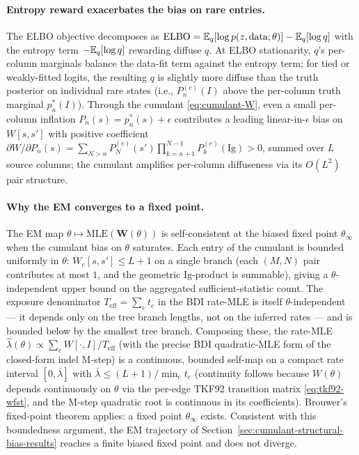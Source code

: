 \paragraph{Entropy reward exacerbates the bias on rare entries.}
The ELBO objective decomposes as $\mathrm{ELBO} = \mathbb{E}_q[\log p(z,
\text{data}; \theta)] - \mathbb{E}_q[\log q]$ with the entropy term
$-\mathbb{E}_q[\log q]$ rewarding diffuse $q$.  At ELBO stationarity,
$q$'s per-column marginals balance the data-fit term against the
entropy term; for tied or weakly-fitted logits, the resulting $q$
is slightly more diffuse than the truth posterior on individual
rare states (i.e., $P_n^{(e)}(I)$ above the per-column truth
marginal $p_n^*(I)$).  Through the cumulant
\eqref{eq:cumulant-W}, even a small per-column inflation
$P_n(s) = p_n^*(s) + \epsilon$ contributes a leading
linear-in-$\epsilon$ bias on $W[s, s']$ with positive coefficient
$\partial W / \partial P_n(s) = \sum_{N > n} P_N^{(e)}(s')
\prod_{k=n+1}^{N-1} P_k^{(e)}(\mathrm{Ig}) > 0$, summed over $L$ source
columns; the cumulant amplifies per-column diffuseness via its
$O(L^2)$ pair structure.

\paragraph{Why the EM converges to a fixed point.}
The EM map $\theta \mapsto \mathrm{MLE}(\mathbf{W}(\theta))$ is
self-consistent at the biased fixed point $\theta_\infty$ when
the cumulant bias on $\theta$ saturates.  Each entry of the cumulant
is bounded uniformly in $\theta$:
$W_e[s, s'] \leq L + 1$ on a single branch (each $(M, N)$ pair
contributes at most $1$, and the geometric $\mathrm{Ig}$-product is
summable),
giving a $\theta$-independent upper bound on the aggregated
sufficient-statistic count.  The exposure denominator
$T_{\text{eff}} = \sum_e t_e$ in the BDI rate-MLE
is itself $\theta$-independent ---
it depends only on the tree branch lengths, not on the inferred
rates --- and is bounded below by the smallest tree branch.
Composing these, the rate-MLE $\hat\lambda(\theta) \propto
\sum_e W[\cdot, I] / T_{\text{eff}}$ (with the precise BDI
quadratic-MLE form of the closed-form indel M-step)
is a continuous, bounded self-map on a compact rate interval $[0,
\bar\lambda]$ with $\bar\lambda \leq (L + 1) / \min_e t_e$
(continuity follows because $W(\theta)$ depends continuously on
$\theta$ via the per-edge TKF92 transition matrix
\eqref{eq:tkf92-wfst}, and the M-step quadratic root is continuous
in its coefficients).  Brouwer's fixed-point theorem applies:
a fixed point $\theta_\infty$ exists.  Consistent with this
boundedness argument, the EM trajectory of
Section~\ref{sec:cumulant-structural-bias-results} reaches a finite
biased fixed point and does not diverge.

